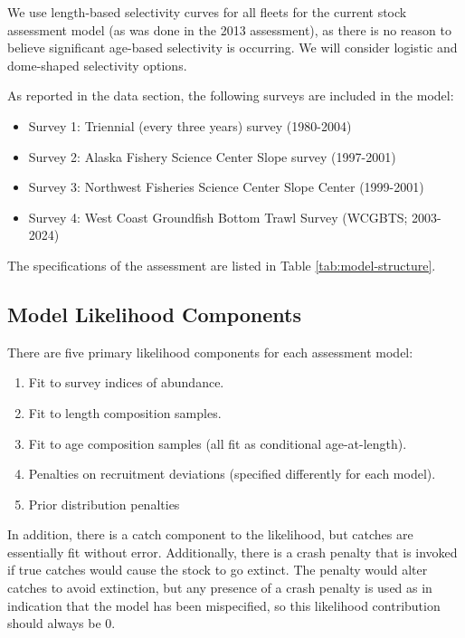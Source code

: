 \documentclass[
]{scrartcl}
\providecommand{\tightlist}{%
  \setlength{\itemsep}{0pt}\setlength{\parskip}{0pt}}\usepackage{longtable,booktabs,array}
\begin{document}
We use length-based selectivity curves for all fleets for the current
stock assessment model (as was done in the 2013 assessment), as there is
no reason to believe significant age-based selectivity is occurring. We
will consider logistic and dome-shaped selectivity options.

As reported in the data section, the following surveys are included in
the model:

\begin{itemize}
\tightlist
\item
  Survey 1: Triennial (every three years) survey (1980-2004)\\
\item
  Survey 2: Alaska Fishery Science Center Slope survey (1997-2001)
\item
  Survey 3: Northwest Fisheries Science Center Slope Center (1999-2001)
\item
  Survey 4: West Coast Groundfish Bottom Trawl Survey (WCGBTS;
  2003-2024)
\end{itemize}

The specifications of the assessment are listed in Table
\ref{tab:model-structure}.

\subsection{Model Likelihood
Components}\label{model-likelihood-components}

There are five primary likelihood components for each assessment model:

\begin{enumerate}
\def\labelenumi{\arabic{enumi}.}
\tightlist
\item
  Fit to survey indices of abundance.
\item
  Fit to length composition samples.
\item
  Fit to age composition samples (all fit as conditional age-at-length).
\item
  Penalties on recruitment deviations (specified differently for each
  model).
\item
  Prior distribution penalties
\end{enumerate}

In addition, there is a catch component to the likelihood, but catches
are essentially fit without error. Additionally, there is a crash
penalty that is invoked if true catches would cause the stock to go
extinct. The penalty would alter catches to avoid extinction, but any
presence of a crash penalty is used as in indication that the model has
been mispecified, so this likelihood contribution should always be 0.
\end{document}
